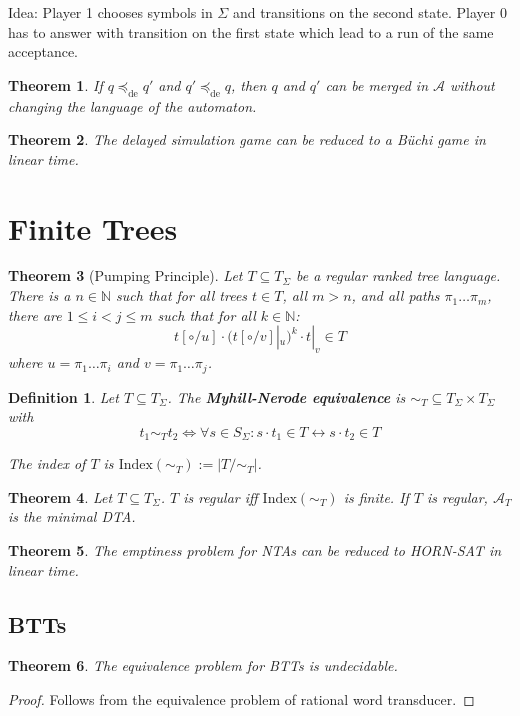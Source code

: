 \documentclass{article}
\newtheorem{theorem}{Theorem}[section]
\newtheorem{definition}{Definition}
\begin{document}
Idea: Player 1 chooses symbols in $\Sigma$ and transitions on the second state. Player 0 has to answer with transition on the first state which lead to a run of the same acceptance.

\begin{theorem}
	If $q \preceq_\text{de} q'$ and $q' \preceq_\text{de} q$, then $q$ and $q'$ can be merged in $\mathcal{A}$ without changing the language of the automaton.
\end{theorem}

\begin{theorem}
	The delayed simulation game can be reduced to a Büchi game in linear time.
\end{theorem}
 

\section{Finite Trees}
\begin{theorem}[Pumping Principle]
	Let $T \subseteq T_\Sigma$ be a regular ranked tree language. There is a $n \in \mathbb{N}$ such that for all trees $t \in T$, all $m > n$, and all paths $\pi_1 \dots \pi_m$, there are $1 \leq i < j \leq m$ such that for all $k \in \mathbb{N}$:
	$$t[\circ / u] \cdot (t[\circ/v]|_u)^k \cdot t|_v \in T$$
	where $u = \pi_1 \dots \pi_i$ and $v = \pi_1 \dots \pi_j$.
\end{theorem}

\begin{definition}
	Let $T \subseteq T_\Sigma$. The \textbf{Myhill-Nerode equivalence} is $\sim_T \subseteq T_\Sigma \times T_\Sigma$ with 
	$$t_1 \sim_T t_2 \Leftrightarrow \forall s \in S_\Sigma: s \cdot t_1 \in T \leftrightarrow s \cdot t_2 \in T$$
	
	The index of $T$ is $\text{Index}(\sim_T) := |T/\sim_T|$.
\end{definition}

\begin{theorem}
	Let $T \subseteq T_\Sigma$. $T$ is regular iff $\text{Index}(\sim_T)$ is finite. If $T$ is regular, $\mathcal{A}_T$ is the minimal DTA.
\end{theorem}

\begin{theorem}
	The emptiness problem for NTAs can be reduced to \textsf{HORN-SAT} in linear time.
\end{theorem}

\subsection{BTTs}
\begin{theorem}
	The equivalence problem for BTTs is undecidable.
\end{theorem}
\begin{proof}
	Follows from the equivalence problem of rational word transducer.
\end{proof}
\end{document}
